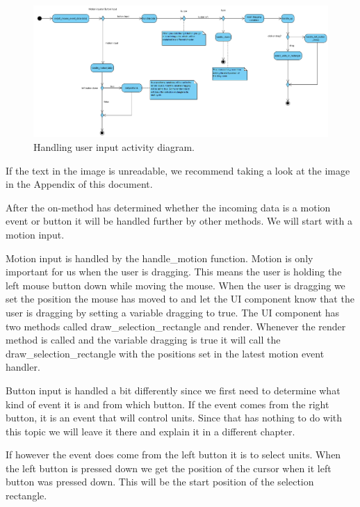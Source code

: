 \begin{figure}[!htb]
    \centering
    \includegraphics[scale=0.55]{res/ActivityDiagramMouseHandler.png}
    \caption{Handling user input activity diagram.}
\end{figure}

If the text in the image is unreadable, we recommend taking a look at the image in the Appendix of this document.

After the on-method has determined whether the incoming data is a motion event or button it will be handled further by other methods. We will start with a motion input.

Motion input is handled by the handle\_motion function. Motion is only important for us when the user is dragging. This means the user is holding the left mouse button down while moving the mouse. When the user is dragging we set the position the mouse has moved to and let the UI component know that the user is dragging by setting a variable dragging to true. The UI component has two methods called draw\_selection\_rectangle and render. Whenever the render method is called and the variable dragging is true it will call the draw\_selection\_rectangle with the positions set in the latest motion event handler.

Button input is handled a bit differently since we first need to determine what kind of event it is and from which button. If the event comes from the right button, it is an event that will control units. Since that has nothing to do with this topic we will leave it there and explain it in a different chapter. 

If however the event does come from the left button it is to select units. When the left button is pressed down we get the position of the cursor when it left button was pressed down. This will be the start position of the selection rectangle.   

